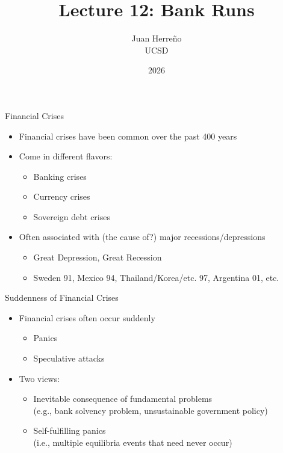 \documentclass[11pt,aspectratio=169,xcolor={dvipsnames},hyperref={pdftex,pdfpagemode=UseNone,hidelinks,pdfdisplaydoctitle=true},usepdftitle=false]{beamer}
\title{Lecture 12: Bank Runs}
\author{Juan Herre\~{n}o\\UCSD}
\date{2026}
\begin{document}
\maketitle




\begin{frame}{Financial Crises}
\begin{itemize}
	\itemsep1em 
	\item Financial crises have been common over the past 400 years
	\item Come in different flavors:
	\begin{itemize}
		\item Banking crises
		\item Currency crises
		\item Sovereign debt crises
	\end{itemize}
	\item Often associated with (the cause of?) major recessions/depressions
	\begin{itemize}
		\item Great Depression, Great Recession
		\item Sweden 91, Mexico 94, Thailand/Korea/etc. 97, Argentina 01, etc.
	\end{itemize}
\end{itemize}
\end{frame}


\begin{frame}{Suddenness of Financial Crises}
\begin{itemize}
	\itemsep1em 
	\item Financial crises often occur suddenly 
	\begin{itemize}
		\item Panics
		\item Speculative attacks
	\end{itemize}
	\item Two views:
	\begin{itemize}
		\item Inevitable consequence of fundamental problems \\ (e.g., bank solvency problem, unsustainable government policy)
		\item Self-fulfilling panics \\ (i.e., multiple equilibria events that need never occur) 
	\end{itemize}
\end{itemize}
\end{frame}
\end{document}
